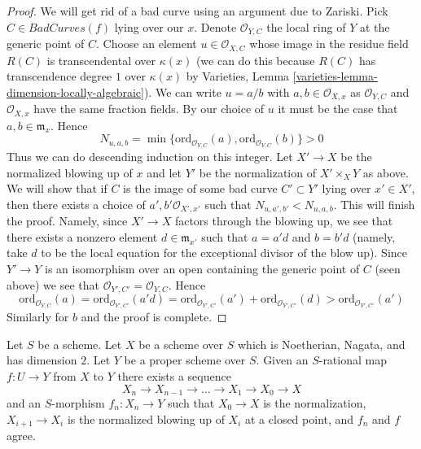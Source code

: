 \begin{proof}
\medskip\noindent
We will get rid of a bad curve using an argument due to Zariski.
Pick $C \in BadCurves(f)$ lying over our $x$. Denote $\mathcal{O}_{Y, C}$
the local ring of $Y$ at the generic point of $C$. Choose an element
$u \in \mathcal{O}_{X, C}$ whose image in the residue field
$R(C)$ is transcendental over $\kappa(x)$ (we can do this because
$R(C)$ has transcendence degree $1$ over $\kappa(x)$ by
Varieties, Lemma \ref{varieties-lemma-dimension-locally-algebraic}).
We can write $u = a/b$ with $a, b \in \mathcal{O}_{X, x}$ as
$\mathcal{O}_{Y, C}$ and $\mathcal{O}_{X, x}$ have the same
fraction fields. By our choice of $u$ it must be the case that
$a, b \in \mathfrak m_x$. Hence
$$
N_{u, a, b} = \min
\{\text{ord}_{\mathcal{O}_{Y, C}}(a), \text{ord}_{\mathcal{O}_{Y, C}}(b)\} > 0
$$
Thus we can do descending induction on this integer.
Let $X' \to X$ be the normalized blowing up of $x$
and let $Y'$ be the normalization of $X' \times_X Y$ as above. We will
show that if $C$ is the image of some bad curve $C' \subset Y'$
lying over $x' \in X'$, then
there exists a choice of $a', b' \mathcal{O}_{X', x'}$
such that $N_{u, a', b'} < N_{u, a, b}$. This will finish the proof.
Namely, since $X' \to X$ factors through the blowing up, we see that
there exists a nonzero element $d \in \mathfrak m_{x'}$ such that
$a = a' d$ and $b = b' d$ (namely, take $d$ to be the local equation
for the exceptional divisor of the blow up). Since $Y' \to Y$
is an isomorphism over an open containing the generic point of $C$
(seen above) we see that $\mathcal{O}_{Y', C'} = \mathcal{O}_{Y, C}$.
Hence
$$
\text{ord}_{\mathcal{O}_{Y, C}}(a) =
\text{ord}_{\mathcal{O}_{Y', C'}}(a' d) =
\text{ord}_{\mathcal{O}_{Y', C'}}(a') +
\text{ord}_{\mathcal{O}_{Y', C'}}(d) >
\text{ord}_{\mathcal{O}_{Y', C'}}(a')
$$
Similarly for $b$ and the proof is complete.
\end{proof}

\begin{lemma}
\label{lemma-extend-rational-map-normalized-blowing-up}
Let $S$ be a scheme. Let $X$ be a scheme over $S$ which is
Noetherian, Nagata, and has dimension $2$. Let $Y$ be a proper
scheme over $S$. Given an $S$-rational map $f : U \to Y$ from
$X$ to $Y$ there exists a sequence
$$
X_n \to X_{n - 1} \to \ldots \to X_1 \to X_0 \to X
$$
and an $S$-morphism $f_n : X_n \to Y$ such that $X_0 \to X$ is the
normalization, $X_{i + 1} \to X_i$ is the normalized blowing up of
$X_i$ at a closed point, and $f_n$ and $f$ agree.
\end{lemma}

